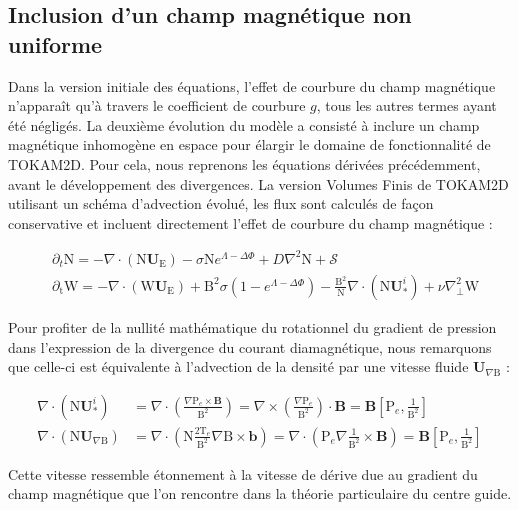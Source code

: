 \begin{refsection}
	\subsection{Inclusion d'un champ magnétique non uniforme}
	
	Dans la version initiale
	des équations, l'effet de courbure du champ magnétique n'apparaît qu'à travers
	le coefficient de courbure $g$, tous les autres termes ayant été négligés.
	La deuxième évolution du modèle a consisté à inclure un champ magnétique
	inhomogène en espace pour élargir le domaine de fonctionnalité de TOKAM2D. Pour
	cela, nous reprenons les équations dérivées précédemment, avant le développement
	des divergences. La version Volumes Finis de TOKAM2D utilisant un schéma
	d'advection évolué, les flux sont calculés de façon conservative et incluent
	directement l'effet de courbure du champ magnétique :
	
\begin{align}
\label{2-eqContinuiteMag}
&\partial_t \text{N}
= - \nabla\cdot\left(\text{N}\mathbf U_\text{E}\right) -\sigma
\text{N}e^{\Lambda-\Delta\Phi} + D\nabla^2 \text{N} + \mathcal{S}
\\
\label{2-eqCourantMag}
&\partial_\text{t}\text{W} = 
-\nabla\cdot\left(\text{W}\mathbf U_\text{E}\right)
+\text{B}^2\sigma\left(1-e^{\Lambda-\Delta\Phi}\right) 
-\frac{\text{B}^2}{\text{N}}\nabla\cdot\left(\text{N}\mathbf U^i_*\right) 
+\nu\nabla_\perp^2\text{W}
\end{align}

Pour profiter de la nullité mathématique du rotationnel du gradient de
pression dans l'expression de la divergence du courant
diamagnétique, nous remarquons que celle-ci est équivalente à l'advection de la
densité par une vitesse fluide $\mathbf U_{\nabla\text{B}}$ :

\begin{align}
\nabla\cdot\left(\text{N}\mathbf U^i_{*}\right)&=
\nabla\cdot\left(\frac{\nabla\text{P}_e\times\mathbf
B}{\text{B}^2}\right)=
\nabla\times\left(\frac{\nabla\text{P}_e}{\text{B}^2}\right)\cdot
\mathbf B=\mathbf B\left[\text{P}_e,\frac{1}{\text{B}^2}\right]\\
\nabla\cdot\left(\text{N}\mathbf U_{\nabla\text{B}}\right)&=
\nabla\cdot\left(\text{N}\frac{2\text{T}_e}{\text{B}^2}\nabla\text{B}\times\mathbf
b\right)=
\nabla\cdot\left(\text{P}_e\nabla\frac{1}{\text{B}^2}\times\mathbf
B\right)=\mathbf B\left[\text{P}_e,\frac{1}{\text{B}^2}\right]
\end{align}

Cette vitesse ressemble étonnement à la vitesse de dérive due au gradient du
champ magnétique que l'on rencontre dans la théorie particulaire du centre
guide. 


\end{refsection}
